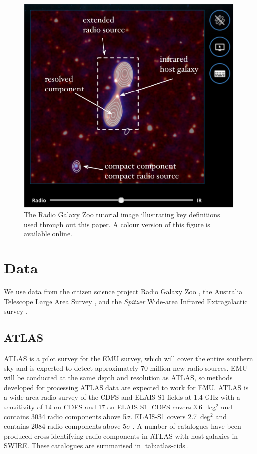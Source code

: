 \documentclass[fleqn,usenatbib,usedcolumn]{mnras}
\newcommand{\jansky}{\text{Jy}}
\begin{document}
  \begin{figure}
\begin{center}
    \includegraphics[width=0.75\linewidth]{images/fig1.png}
    \caption{The Radio Galaxy Zoo tutorial image illustrating key definitions used through out this paper. A colour version of this figure is available online.}\label{fig1}
  \end{center}
  \end{figure}

\section{Data}\label{sec:data}

  We use data from the citizen science project Radio Galaxy Zoo
  \citep{banfield15}, the Australia Telescope Large Area Survey
  \citep[ATLAS;][]{norris08,franzen15}, and the \emph{Spitzer} Wide-area Infrared
  Extragalactic survey \citep[SWIRE;][]{lonsdale03swire, surace05swire}.

  \subsection{ATLAS}\label{sec:atlas}

ATLAS is a pilot survey for the EMU \citep{norris11} survey, which will
    cover the entire southern sky and is expected to detect approximately 70
    million new radio sources. EMU will be conducted at the same depth and
    resolution as ATLAS, so methods developed for processing ATLAS data are
    expected to work for EMU.    ATLAS is a wide-area radio survey of the CDFS and ELAIS-S1
    fields at 1.4 GHz with a sensitivity of
    \unit{14}{\micro\jansky} on CDFS and \unit{17}{\micro\jansky} on ELAIS-S1.
    CDFS covers 3.6~deg$^2$ and contains 3034 radio components above 5$\sigma$.
    ELAIS-S1 covers 2.7~deg$^2$ and contains 2084 radio components above
    5$\sigma$ \citep{franzen15}.  A number of catalogues have been produced cross-identifying radio components
    in ATLAS with host galaxies in SWIRE. These catalogues are summarised in
    \autoref{tab:atlas-cids}.
\end{document}

